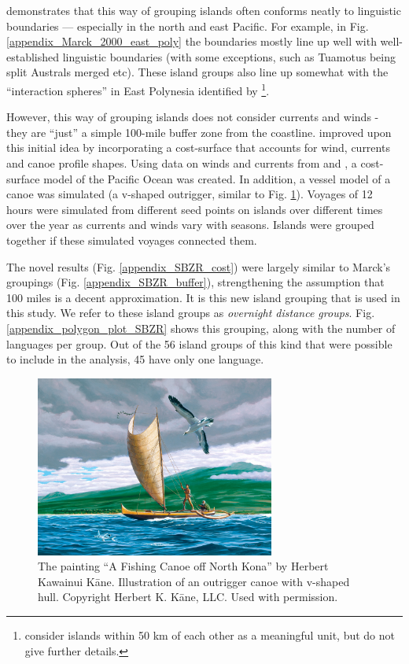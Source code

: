 \documentclass[unnumsec,webpdf,modern,medium]{oup-authoring-template}
\begin{document}
\citet{mark_1986, marck2000} demonstrates that this way of grouping islands often conforms neatly to linguistic boundaries --- especially in the north and east Pacific. For example, in Fig. \ref{appendix_Marck_2000_east_poly} the boundaries mostly line up well with well-established linguistic boundaries (with some exceptions, such as Tuamotus being split Australs merged etc). These island groups also line up somewhat with the ``interaction spheres'' in East Polynesia identified by \citet{rolett2002voyaging}\footnote{\citet{rolett2004environmental} consider islands within 50 km of each other as a meaningful unit, but do not give further details.}. 

However, this way of grouping islands does not consider currents and winds - they are ``just'' a simple 100-mile buffer zone from the coastline. \citet{NZSA_overnight_2023} improved upon this initial idea by incorporating a cost-surface that accounts for wind, currents and canoe profile shapes. Using data on winds and currents from 
\citet{noaa_2019} and \citet{apdrc_2014}, a cost-surface model of the Pacific Ocean was created. In addition, a vessel model of a canoe was simulated (a v-shaped outrigger, similar to Fig. \ref{appendix_kane_fishing_canoe}). Voyages of 12 hours were simulated from different seed points on islands over different times over the year as currents and winds vary with seasons. Islands were grouped together if these simulated voyages connected them.

The novel results (Fig. \ref{appendix_SBZR_cost}) were largely similar to Marck's groupings (Fig. \ref{appendix_SBZR_buffer}), strengthening the assumption that 100 miles is a decent approximation. It is this new island grouping that is used in this study. We refer to these island groups as \textit{overnight distance groups}. Fig. \ref{appendix_polygon_plot_SBZR} shows this grouping, along with the number of languages per group. Out of the 56 island groups of this kind that were possible to include in the analysis, 45 have only one language.

\begin{figure}[ht]
\centering
\includegraphics[width=0.7\textwidth]{Herb-Kane_Fishing-Canoe-off-North-Kona.jpg}
\caption{{The painting ``A Fishing Canoe off North Kona'' by Herbert Kawainui K{\=a}ne. Illustration of an outrigger canoe with v-shaped hull. Copyright Herbert K. K{\=a}ne, LLC. Used with permission.}}
\label{appendix_kane_fishing_canoe}
\end{figure}
\end{document}
